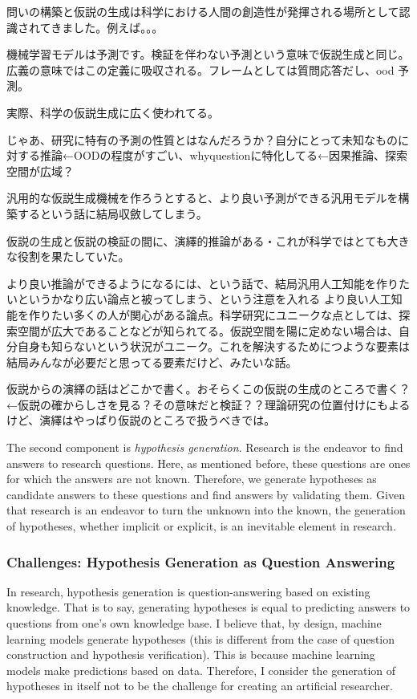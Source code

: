 問いの構築と仮説の生成は科学における人間の創造性が発揮される場所として認識されてきました。例えば。。。

機械学習モデルは予測です。検証を伴わない予測という意味で仮説生成と同じ。広義の意味ではこの定義に吸収される。フレームとしては質問応答だし、ood 予測。

実際、科学の仮説生成に広く使われてる。

じゃあ、研究に特有の予測の性質とはなんだろうか？自分にとって未知なものに対する推論←OODの程度がすごい、whyquestionに特化してる←因果推論、探索空間が広域？

汎用的な仮説生成機械を作ろうとすると、より良い予測ができる汎用モデルを構築するという話に結局収斂してしまう。

仮説の生成と仮説の検証の間に、演繹的推論がある・これが科学ではとても大きな役割を果たしていた。

より良い推論ができるようになるには、という話で、結局汎用人工知能を作りたいというかなり広い論点と被ってしまう、という注意を入れる
より良い人工知能を作りたい多くの人が関心がある論点。科学研究にユニークな点としては、探索空間が広大であることなどが知られてる。仮説空間を陽に定めない場合は、自分自身も知らないという状況がユニーク。これを解決するためにつような要素は結局みんなが必要だと思ってる要素だけど、みたいな話。

仮説からの演繹の話はどこかで書く。おそらくこの仮説の生成のところで書く？←仮説の確からしさを見る？その意味だと検証？？理論研究の位置付けにもよるけど、演繹はやっぱり仮説のところで扱うべきでは。

The second component is \textit{hypothesis generation}. Research is the endeavor to find answers to research questions. Here, as mentioned before, these questions are ones for which the answers are not known. Therefore, we generate hypotheses as candidate answers to these questions and find answers by validating them. Given that research is an endeavor to turn the unknown into the known, the generation of hypotheses, whether implicit or explicit, is an inevitable element in research.

\subsubsection{Challenges: Hypothesis Generation as Question Answering}
In research, hypothesis generation is question-answering based on existing knowledge. That is to say, generating hypotheses is equal to predicting answers to questions from one's own knowledge base. I believe that, by design, machine learning models generate hypotheses (this is different from the case of question construction and hypothesis verification). This is because machine learning models make predictions based on data. Therefore, I consider the generation of hypotheses in itself not to be the challenge for creating an artificial researcher.


